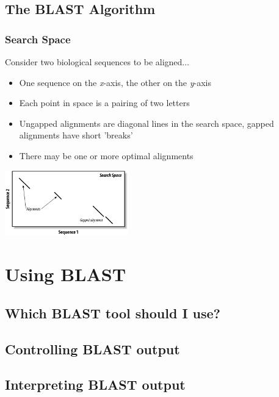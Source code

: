 \documentclass[table]{beamer}
\begin{document}
    \subsection{The BLAST Algorithm}
    \begin{frame}
     \frametitle{Search Space}
     Consider two biological sequences to be aligned$\ldots$
     \begin{itemize}
       \item One sequence on the \textit{x}-axis, the other on the \textit{y}-axis
       \item Each point in space is a pairing of two letters
       \item Ungapped alignments are diagonal lines in the search space, gapped alignments have short 'breaks'
       \item There may be one or more optimal alignments
     \end{itemize}
     \begin{center}
       \includegraphics[width=0.4\textwidth]{images/search_space} 
     \end{center}
   \end{frame}


   
  \section{Using BLAST}
    \subsection{Which BLAST tool should I use?}
    \begin{frame}
     \frametitle{}
    \end{frame}

    \subsection{Controlling BLAST output}
    \begin{frame}
     \frametitle{}
    \end{frame}
     
    \subsection{Interpreting BLAST output}
    \begin{frame}
     \frametitle{}
    \end{frame}
    
\end{document}
